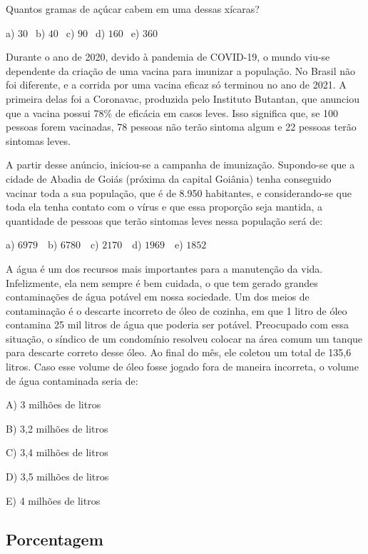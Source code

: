\begin{multicols*}{2}
		      Quantos gramas de açúcar cabem em uma dessas xícaras?

		      a) $30 \ \ $ b) $40 \ \ $ c) $90 \ \ $ d) $160 \ \ $ e) $360 \ \ $

		\execnum Durante o ano de 2020, devido à pandemia de COVID-19, o mundo viu-se dependente da criação de uma vacina para imunizar a população. No Brasil não foi diferente, e a corrida por uma vacina eficaz só terminou no ano de 2021. A primeira delas foi a Coronavac, produzida pelo Instituto Butantan, que anunciou que a vacina possui 78\% de eficácia em casos leves. Isso significa que, se 100 pessoas forem vacinadas, 78 pessoas não terão sintoma algum e 22 pessoas terão sintomas leves.

		      A partir desse anúncio, iniciou-se a campanha de imunização. Supondo-se que a cidade de Abadia de Goiás (próxima da capital Goiânia) tenha conseguido vacinar toda a sua população, que é de 8.950 habitantes, e considerando-se que toda ela tenha contato com o vírus e que essa proporção seja mantida, a quantidade de pessoas que terão sintomas leves nessa população será de:

		      a) $6979 \ \ \ $ b) $6780 \ \ \ $ c) $2170 \ \ \ $ d) $1969 \ \ \ $ e) $1852 \ \ $

		\execnum A água é um dos recursos mais importantes para a manutenção da vida. Infelizmente, ela nem sempre é bem cuidada, o que tem gerado grandes contaminações de água potável em nossa sociedade. Um dos meios de contaminação é o descarte incorreto de óleo de cozinha, em que 1 litro de óleo contamina 25 mil litros de água que poderia ser potável. Preocupado com essa situação, o síndico de um condomínio resolveu colocar na área comum um tanque para descarte correto desse  óleo. Ao final do mês, ele coletou um total de 135,6 litros. Caso esse volume de óleo fosse jogado fora de maneira incorreta, o volume de água contaminada seria de:

		      A) 3 milhões de litros

		      B) 3,2 milhões de litros

		      C) 3,4 milhões de litros

		      D) 3,5 milhões de litros

		      E) 4 milhões de litros


	\subsection*{Porcentagem}


\end{multicols*}
